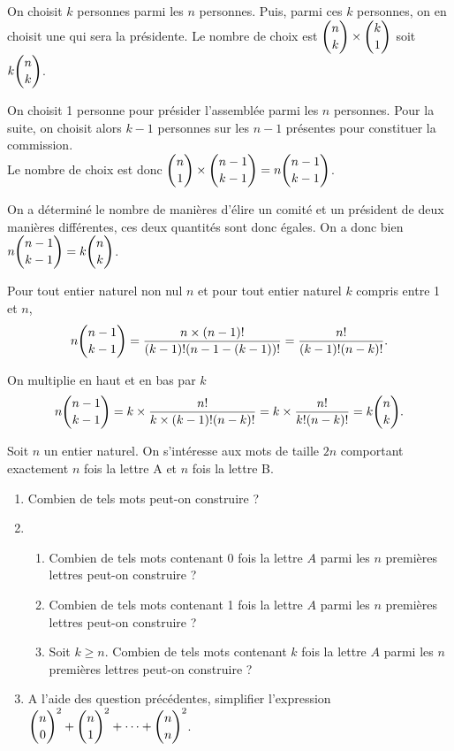 \documentclass[11pt,fleqn, openany]{book} %
\begin{document}
\begin{solution}On choisit $k$ personnes parmi les $n$ personnes. Puis, parmi ces $k$ personnes, on en choisit une qui sera la présidente. Le nombre de choix est $\dbinom{n}{k} \times \dbinom{k}{1}$ soit $k \dbinom{n}{k}$.

 On choisit 1 personne pour présider l'assemblée parmi les $n$ personnes. Pour la suite, on choisit alors $k-1$ personnes sur les $n-1$ présentes pour constituer la commission.\\ Le nombre de choix est donc $\dbinom{n}{1} \times \dbinom{n-1}{k-1}=n \dbinom{n-1}{k-1}$.
 
 On a déterminé le nombre de manières d'élire un comité et un président de deux manières différentes, ces deux quantités sont donc égales. On a donc bien $ n \dbinom{n-1}{k-1} = k \dbinom{n}{k}$.
 
 Pour tout entier naturel non nul $n$ et pour tout entier naturel $k$ compris entre 1 et $n$,
\[ n \dbinom{n-1}{k-1} = \dfrac{n \times (n-1)!}{(k-1)!(n-1-(k-1))!}=\dfrac{n!}{(k-1)!(n-k)!}.\]

On multiplie en haut et en bas par $k$
\[  n \dbinom{n-1}{k-1}=k\times \dfrac{n!}{k\times (k-1)!(n-k)!}=k\times \dfrac{n!}{k!(n-k)!}= k \dbinom{n}{k} .\]\end{solution}




\begin{exercise}Soit $n$ un entier naturel. On s'intéresse aux mots de taille $2n$ comportant exactement $n$ fois la lettre A et $n$ fois la lettre B.

\begin{enumerate}
\item Combien de tels mots peut-on construire ?
\item \begin{enumerate}
\item Combien de tels mots contenant 0 fois la lettre $A$ parmi les $n$ premières lettres peut-on construire ?
\item Combien de tels mots contenant 1 fois la lettre $A$ parmi les $n$ premières lettres peut-on construire ?
\item Soit $k\geqslant n$. Combien de tels mots contenant $k$ fois la lettre $A$ parmi les $n$ premières lettres peut-on construire ?
\end{enumerate}
\item A l'aide des question précédentes, simplifier l'expression $\dbinom{n}{0}^2+\dbinom{n}{1}^2+\dots+\dbinom{n}{n}^2$.
\end{enumerate}
\end{exercise}
\end{document}
